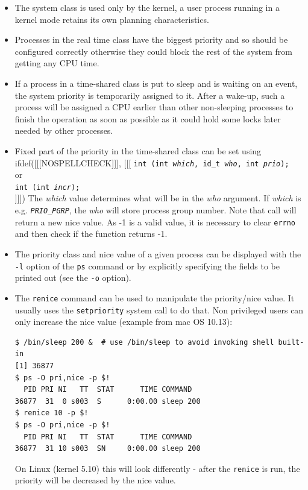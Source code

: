 \begin{itemize}
\item The system class is used only by the kernel, a user process running
in a kernel mode retains its own planning characteristics.
\item Processes in the real time class have the biggest priority and so should
be configured correctly otherwise they could block the rest of the system from
getting any CPU time.
\item If a process in a time-shared class is put to sleep and is waiting on an
event, the system priority is temporarily assigned to it.  After a wake-up, such
a process will be assigned a CPU earlier than other non-sleeping processes to
finish the operation as soon as possible as it could hold some locks later
needed by other processes.
\item Fixed part of the priority in the time-shared class can be set using\\
ifdef([[[NOSPELLCHECK]]], [[[
\texttt{int (int \emph{which}, id\_t \emph{who},
int \emph{prio});}\\ or \\ \texttt{int (int \emph{in{}cr});} \\
]]])
The \emph{which} value determines what will be in the \emph{who} argument.
If \emph{which} is e.g. \emph{\texttt{PRIO\_PGRP}}, the \emph{who} will store
process group number.  Note that  call will return a new nice value.
As -1 is a valid value, it is necessary to clear \texttt{errno} and then check
if the function returns -1.
\item The priority class and nice value of a given process can be displayed with
the \texttt{-l} option of the \texttt{ps} command or by explicitly specifying
the fields to be printed out (see the \texttt{-o} option).
\item The \texttt{renice} command can be used to manipulate the priority/nice
value. It usually uses the \texttt{setpriority} system call to do that.
Non privileged users can only increase the nice value (example from
mac OS 10.13):
\begin{verbatim}
$ /bin/sleep 200 &  # use /bin/sleep to avoid invoking shell built-in
[1] 36877
$ ps -O pri,nice -p $!
  PID PRI NI   TT  STAT      TIME COMMAND
36877  31  0 s003  S      0:00.00 sleep 200
$ renice 10 -p $!
$ ps -O pri,nice -p $!
  PID PRI NI   TT  STAT      TIME COMMAND
36877  31 10 s003  SN     0:00.00 sleep 200
\end{verbatim}

On Linux (kernel 5.10) this will look differently - after the \texttt{renice}
is run, the priority will be decreased by the nice value.
\end{itemize}

